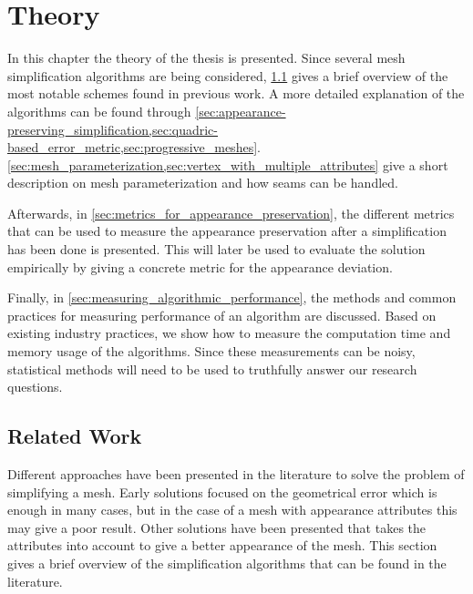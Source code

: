 

\chapter{Theory} \label{ch:theory}
In this chapter the theory of the thesis is presented.
Since several mesh simplification algorithms are being considered, \cref{sec:related_work} gives a brief overview of the most notable schemes found in previous work. A more detailed explanation of the algorithms can be found through \cref{sec:appearance-preserving_simplification,sec:quadric-based_error_metric,sec:progressive_meshes}. \cref{sec:mesh_parameterization,sec:vertex_with_multiple_attributes} give a short description on mesh parameterization and how seams can be handled.

Afterwards, in \cref{sec:metrics_for_appearance_preservation}, the different metrics that can be used to measure the appearance preservation after a simplification has been done is presented. This will later be used to evaluate the solution empirically by giving a concrete metric for the appearance deviation.

Finally, in \cref{sec:measuring_algorithmic_performance}, the methods and common practices for measuring performance of an algorithm are discussed. Based on existing industry practices, we show how to measure the computation time and memory usage of the algorithms. Since these measurements can be noisy, statistical methods will need to be used to truthfully answer our research questions.

\section{Related Work} \label{sec:related_work}
Different approaches have been presented in the literature to solve the problem of simplifying a mesh. Early solutions focused on the geometrical error which is enough in many cases, but in the case of a mesh with appearance attributes this may give a poor result. Other solutions have been presented that takes the attributes into account to give a better appearance of the mesh. This section gives a brief overview of the simplification algorithms that can be found in the literature.

